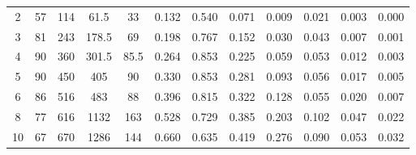 \begin{table}[htbp]
{\begin{tabular}{cccccccccccc}
            2                                   & 57             & 114                   & 61.5                        & 33                        & 0.132             & 0.540        & 0.071                    & 0.009                      & 0.021                        & 0.003                               & 0.000                                 \\
            3                                   & 81             & 243                   & 178.5                       & 69                        & 0.198             & 0.767        & 0.152                    & 0.030                      & 0.043                        & 0.007                               & 0.001                                 \\
            4                                   & 90             & 360                   & 301.5                       & 85.5                      & 0.264             & 0.853        & 0.225                    & 0.059                      & 0.053                        & 0.012                               & 0.003                                 \\
            5                                   & 90             & 450                   & 405                         & 90                        & 0.330             & 0.853        & 0.281                    & 0.093                      & 0.056                        & 0.017                               & 0.005                                 \\
            6                                   & 86             & 516                   & 483                         & 88                        & 0.396             & 0.815        & 0.322                    & 0.128                      & 0.055                        & 0.020                               & 0.007                                 \\
            8                                   & 77             & 616                   & 1132                        & 163                       & 0.528             & 0.729        & 0.385                    & 0.203                      & 0.102                        & 0.047                               & 0.022                                 \\
            10                                  & 67             & 670                   & 1286                        & 144                       & 0.660             & 0.635        & 0.419                    & 0.276                      & 0.090                        & 0.053                               & 0.032                                 \\

\end{tabular}}
\end{table}
